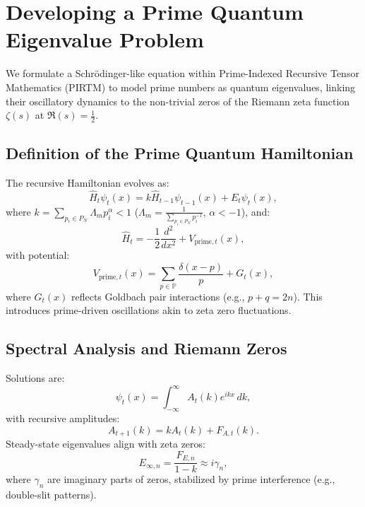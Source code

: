 \documentclass[11pt]{article}
\theoremstyle{plain}
\begin{document}
\section{Developing a Prime Quantum Eigenvalue Problem}
\label{sec:quantum_eigenvalue}

We formulate a Schrödinger-like equation within Prime-Indexed Recursive Tensor Mathematics (PIRTM) to model prime numbers as quantum eigenvalues, linking their oscillatory dynamics to the non-trivial zeros of the Riemann zeta function \( \zeta(s) \) at \( \Re(s) = \frac{1}{2} \).

\subsection{Definition of the Prime Quantum Hamiltonian}
The recursive Hamiltonian evolves as:
\begin{equation}
    \hat{H}_t \psi_t(x) = k \hat{H}_{t-1} \psi_{t-1}(x) + E_t \psi_t(x),
\end{equation}
where \( k = \sum_{p_i \in P_N} \Lambda_m p_i^\alpha < 1 \) (\( \Lambda_m = \frac{1}{\sum_{p_i \in P_N} p_i^{-1}} \), \( \alpha < -1 \)), and:
\begin{equation}
    \hat{H}_t = -\frac{1}{2} \frac{d^2}{dx^2} + V_{\text{prime},t}(x),
\end{equation}
with potential:
\begin{equation}
    V_{\text{prime},t}(x) = \sum_{p \in \mathbb{P}} \frac{\delta(x - p)}{p} + G_t(x),
\end{equation}
where \( G_t(x) \) reflects Goldbach pair interactions (e.g., \( p + q = 2n \)). This introduces prime-driven oscillations akin to zeta zero fluctuations.

\subsection{Spectral Analysis and Riemann Zeros}
Solutions are:
\begin{equation}
    \psi_t(x) = \int_{-\infty}^{\infty} A_t(k) e^{i k x} \, dk,
\end{equation}
with recursive amplitudes:
\begin{equation}
    A_{t+1}(k) = k A_t(k) + F_{A,t}(k).
\end{equation}
Steady-state eigenvalues align with zeta zeros:
\begin{equation}
    E_{\infty,n} = \frac{F_{E,n}}{1 - k} \approx i \gamma_n,
\end{equation}
where \( \gamma_n \) are imaginary parts of zeros, stabilized by prime interference (e.g., double-slit patterns).
\end{document}
